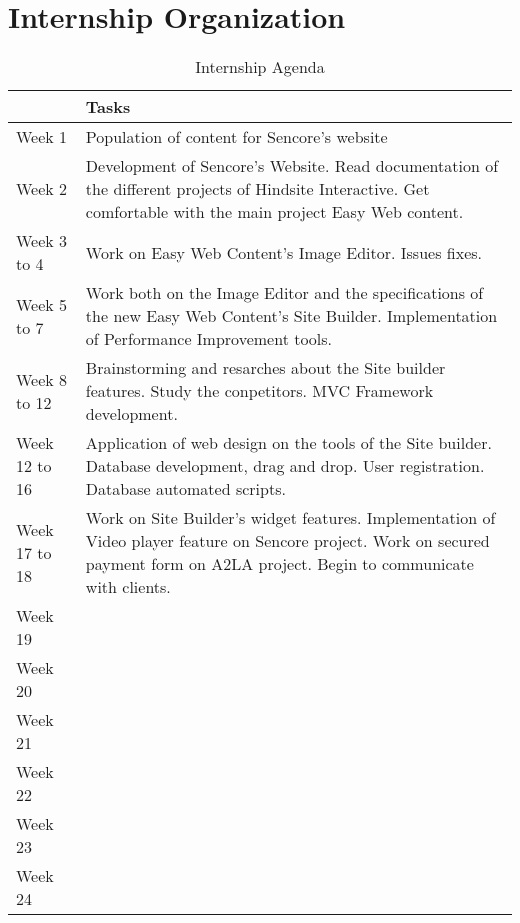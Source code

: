 \chapter{Internship Organization}

\begin{table}[!ht]
	\caption{\label{tableau:agenda}Internship Agenda}
	\begin{tabular}{ | l | p{15cm} | }
		\hline
		 & Tasks\\
		\hline
		Week 1	&	Population of content for Sencore's website\\	\hline
		Week 2	&	Development of Sencore's Website. Read documentation of the different projects of Hindsite Interactive. Get comfortable with the main project Easy Web content.\\	\hline
		Week 3 to 4	&	Work on Easy Web Content's Image Editor. Issues fixes.\\	\hline
		Week 5 to 7	&	Work both on the Image Editor and the specifications of the new Easy Web Content's Site Builder. Implementation of Performance Improvement tools.\\	\hline
		Week 8 to 12	&	Brainstorming and resarches about the Site builder features. Study the conpetitors. MVC Framework development.\\	\hline
		Week 12 to 16	&	Application of web design on the tools of the Site builder. Database development, drag and drop. User registration. Database automated scripts.	\\	\hline
		Week 17	to 18&	Work on Site Builder's widget features. Implementation of Video player feature on Sencore project. Work on secured payment form on A2LA project. Begin to communicate with clients.\\	\hline
		Week 19	&	\\	\hline
		Week 20	&	\\	\hline
		Week 21	&	\\	\hline
		Week 22	&	\\	\hline
		Week 23	&	\\	\hline
		Week 24	&	\\	\hline
	\end{tabular}
\end{table}